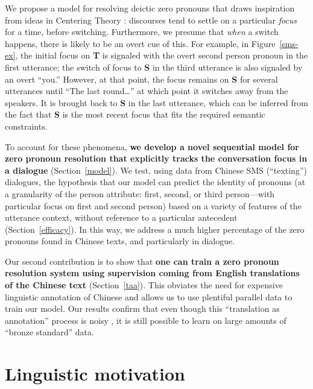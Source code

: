 \documentclass[11pt]{report}
\newcommand{\speaker}[1]{{\bf\footnotesize\textsf{#1}}}
\begin{document}
We propose a model for resolving deictic zero pronouns that draws inspiration from ideas in Centering Theory \cite{grosz1995centering}: discourses tend to settle on a particular \emph{focus} for a time, before switching. Furthermore, we presume that \emph{when} a switch happens, there is likely to be an overt cue of this. For example, in Figure~\ref{sms-ex}, the initial focus on \speaker{T} is signaled with the overt second person pronoun in the first utterance; the switch of focus to \speaker{S} in the third utterance is also signaled by an overt ``you.'' However, at that point, the focus remains on \speaker{S} for several utterances until ``The last round\dots'' at which point it switches away from the speakers. It is brought back to \speaker{S} in the last utterance, which can be inferred from the fact that \speaker{S} is the most recent focus that fits the required semantic constraints.

To account for these phenomena, \textbf{we develop a novel sequential model for zero pronoun resolution that explicitly tracks the conversation focus in a dialogue} (Section~\ref{model}). We test, using data from Chinese SMS (``texting'') dialogues, the hypothesis that our model can predict the identity of pronouns (at a granularity of the person attribute: first, second, or third person---with particular focus on first and second person) based on a variety of features of the utterance context, without reference to a particular antecedent (Section~\ref{efficacy}). In this way, we address a much higher percentage of the zero pronouns found in Chinese texts, and particularly in dialogue.

Our second contribution is to show that \textbf{one can train a zero pronoun resolution system using supervision coming from English translations of the Chinese text} (Section~\ref{taa}). This obviates the need for expensive linguistic annotation of Chinese and allows us to use plentiful parallel data to train our model. Our results confirm that even though this ``translation as annotation'' process is noisy%
, it is still possible to learn on large amounts of ``bronze standard'' data.%

\section{Linguistic motivation} \label{ling}
\end{document}
